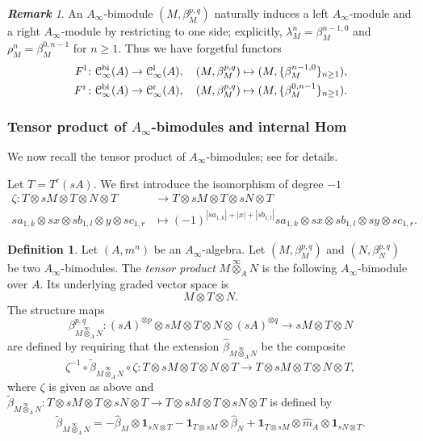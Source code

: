 \documentclass[a4paper, 11pt]{amsart}
\theoremstyle{definition}
\newtheorem{defn}[thm]{Definition}
\theoremstyle{remark}
\newtheorem{rem}[thm]{\bf Remark}
\numberwithin{equation}{section}
\newcommand{\LL}{\mathrm{l}}
\newcommand{\RR}{\mathrm{r}}
\newcommand{\BB}{\mathrm{bi}}
\newcommand{\EC}{\EuScript{C}}
\begin{document}
\begin{rem}\label{rem:forgetfulfunctor}
An $A_\infty$-bimodule $(M,\beta_M^{p,q})$ naturally induces a left $A_\infty$-module and a right $A_\infty$-module by restricting to one side; explicitly, $\lambda_M^n=\beta_M^{n-1,0}$ and $\rho_M^n=\beta_M^{0,n-1}$ for $n\geq 1$. Thus we have forgetful functors
\begin{align*}
F^{\LL} &\colon \EC^{\BB}_\infty(A) \to \EC^{\LL}_\infty(A), \quad (M, \beta_M^{p, q}) \mapsto (M, \{\beta_M^{n-1,0}\}_{n\geq 1}),\\
F^{\RR} &\colon \EC^{\BB}_\infty(A) \to \EC^{\RR}_\infty(A), \quad (M, \beta_M^{p, q}) \mapsto (M, \{\beta_M^{0,n-1}\}_{n\geq 1}).
\end{align*}
\end{rem}

\subsubsection{\textbf{\textup{Tensor product of $A_\infty$-bimodules and internal Hom}}}
We now recall the tensor product of $A_\infty$-bimodules; see \cite[Definition 10]{Fer12} for details.

Let $T=T^c(sA)$. We first introduce the isomorphism of degree $-1$
\begin{align*}
\zeta\colon T \otimes sM \otimes T \otimes N \otimes T &\longrightarrow T \otimes sM \otimes T \otimes sN \otimes T \\
sa_{1, k} \otimes sx \otimes sb_{1, l} \otimes y \otimes sc_{1, r} &\mapsto (-1)^{|sa_{1,k}|+|x|+|sb_{1,l}|} sa_{1, k}
\otimes sx \otimes sb_{1,l} \otimes sy \otimes sc_{1, r}.
\end{align*}


\begin{defn}
Let $(A, m^n)$ be an $A_\infty$-algebra. Let $(M, \beta_M^{p, q})$ and $(N, \beta_N^{p, q})$ be two $A_\infty$-bimodules.
The {\it tensor product} $M\overset{\infty}\otimes_A N$ is the following $A_\infty$-bimodule over $A$. Its underlying graded vector space is
\[
M\otimes T\otimes N.
\]
The structure maps
\[
\beta_{M \overset{\infty}\otimes_A N}^{p, q} \colon (sA)^{\otimes p}\otimes sM \otimes T \otimes N \otimes (sA)^{\otimes q} \to sM \otimes T \otimes N
\]
are defined by requiring that the extension $\widehat\beta_{M\overset{\infty}\otimes_A N}$ be the composite
\[
 \zeta^{-1} \circ \widetilde \beta_{M \overset{\infty}\otimes_A N} \circ \zeta \colon T \otimes sM \otimes T \otimes N \otimes T \to T \otimes sM \otimes T \otimes N \otimes T,
\]
where $\zeta$ is given as above and $\widetilde \beta_{M \overset{\infty}\otimes_A N} \colon T \otimes sM \otimes T \otimes sN \otimes T \to T \otimes sM \otimes T \otimes sN \otimes T$ is defined by
\[
 \widetilde \beta_{M \overset{\infty}\otimes_A N} = -\widehat \beta_M \otimes \mathbf 1_{sN \otimes T} - \mathbf 1_{T\otimes sM}\otimes \widehat \beta_N + \mathbf 1_{T\otimes sM} \otimes \widehat m_A \otimes \mathbf 1_{sN\otimes T} .
\]
\end{defn}
\end{document}

